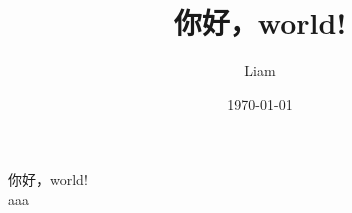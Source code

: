 \documentclass[UTF8]{ctexart}
\title{你好，world!}
\author{Liam}
\date{\today}
\begin{document}
\maketitle
你好，world!  \\
aaa
\end{document}
